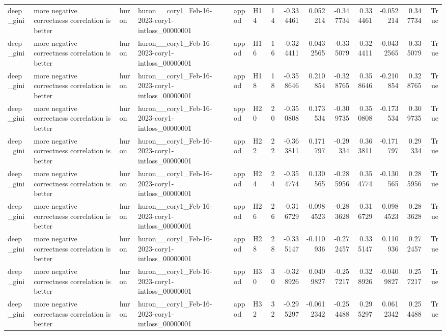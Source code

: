 \begin{longtable}{llllllrrrrrrrr}
deep\_gini & more negative correctness correlation is better & huron & huron\_\_cory1\_Feb-16-2023-cory1-intloss\_00000001 & appod & H14 & 14 & -0.334461 & 0.052214 & -0.347734 & 0.334461 & -0.052214 & 0.347734 & True \\
deep\_gini & more negative correctness correlation is better & huron & huron\_\_cory1\_Feb-16-2023-cory1-intloss\_00000001 & appod & H16 & 16 & -0.324411 & 0.0432565 & -0.335079 & 0.324411 & -0.0432565 & 0.335079 & True \\
deep\_gini & more negative correctness correlation is better & huron & huron\_\_cory1\_Feb-16-2023-cory1-intloss\_00000001 & appod & H18 & 18 & -0.358646 & 0.210854 & -0.328765 & 0.358646 & -0.210854 & 0.328765 & True \\
deep\_gini & more negative correctness correlation is better & huron & huron\_\_cory1\_Feb-16-2023-cory1-intloss\_00000001 & appod & H20 & 20 & -0.350808 & 0.173534 & -0.309735 & 0.350808 & -0.173534 & 0.309735 & True \\
deep\_gini & more negative correctness correlation is better & huron & huron\_\_cory1\_Feb-16-2023-cory1-intloss\_00000001 & appod & H22 & 22 & -0.363811 & 0.171797 & -0.29334 & 0.363811 & -0.171797 & 0.29334 & True \\
deep\_gini & more negative correctness correlation is better & huron & huron\_\_cory1\_Feb-16-2023-cory1-intloss\_00000001 & appod & H24 & 24 & -0.354774 & 0.130565 & -0.285956 & 0.354774 & -0.130565 & 0.285956 & True \\
deep\_gini & more negative correctness correlation is better & huron & huron\_\_cory1\_Feb-16-2023-cory1-intloss\_00000001 & appod & H26 & 26 & -0.316729 & -0.0984523 & -0.283628 & 0.316729 & 0.0984523 & 0.283628 & True \\
deep\_gini & more negative correctness correlation is better & huron & huron\_\_cory1\_Feb-16-2023-cory1-intloss\_00000001 & appod & H28 & 28 & -0.335147 & -0.110936 & -0.272457 & 0.335147 & 0.110936 & 0.272457 & True \\
deep\_gini & more negative correctness correlation is better & huron & huron\_\_cory1\_Feb-16-2023-cory1-intloss\_00000001 & appod & H30 & 30 & -0.328926 & 0.0409827 & -0.257217 & 0.328926 & -0.0409827 & 0.257217 & True \\
deep\_gini & more negative correctness correlation is better & huron & huron\_\_cory1\_Feb-16-2023-cory1-intloss\_00000001 & appod & H32 & 32 & -0.295297 & -0.0612342 & -0.254488 & 0.295297 & 0.0612342 & 0.254488 & True \\

\end{longtable}
